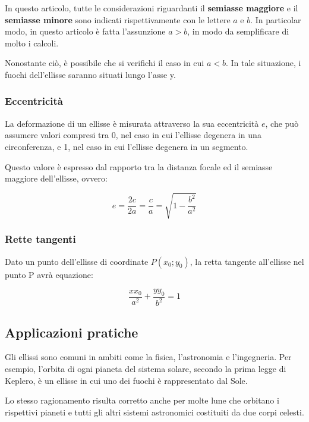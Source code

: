 \documentclass[10pt, a4paper]{article}
\theoremstyle{remark}
\begin{document}
	In questo articolo, tutte le considerazioni riguardanti il \textbf{semiasse maggiore} e il \textbf{semiasse minore} sono indicati rispettivamente con le lettere $a$ e $b$. In particolar modo, in questo articolo è fatta l'assunzione $a>b$, in modo da semplificare di molto i calcoli. 
	
	Nonostante ciò, è possibile che si verifichi il caso in cui $a<b$. In tale situazione, i fuochi dell'ellisse saranno situati lungo l'asse y.
	
	\subsubsection*{Eccentricità}

	La deformazione di un ellisse è misurata attraverso la sua eccentricità $e$, che può assumere valori compresi tra 0, nel caso in cui l'ellisse degenera in una circonferenza, e 1, nel caso in cui l'ellisse degenera in un segmento. 
	
	Questo valore è espresso dal rapporto tra la distanza focale ed il semiasse maggiore dell'ellisse, ovvero:
	
	\begin{equation*}
		e = \frac{2c}{2a} = \frac{c}{a} = \sqrt{1- \frac{b^2}{a^2}}
	\end{equation*}

	\subsubsection*{Rette tangenti}
	
	Dato un punto dell'ellisse di coordinate $P(x_0;y_0)$, la retta tangente all'ellisse nel punto P avrà equazione:
	
	\begin{equation*}
		\frac{xx_0}{a^2} + \frac{yy_0}{b^2} = 1
	\end{equation*}

	\subsection*{Applicazioni pratiche}
	
	Gli ellissi sono comuni in ambiti come la fisica, l'astronomia e l'ingegneria. Per esempio, l'orbita di ogni pianeta del sistema solare, secondo la prima legge di Keplero, è un ellisse in cui uno dei fuochi è rappresentato dal Sole.
	
	Lo stesso ragionamento risulta corretto anche per molte lune che orbitano i rispettivi pianeti e tutti gli altri sistemi astronomici costituiti da due corpi celesti.
	
\end{document}
